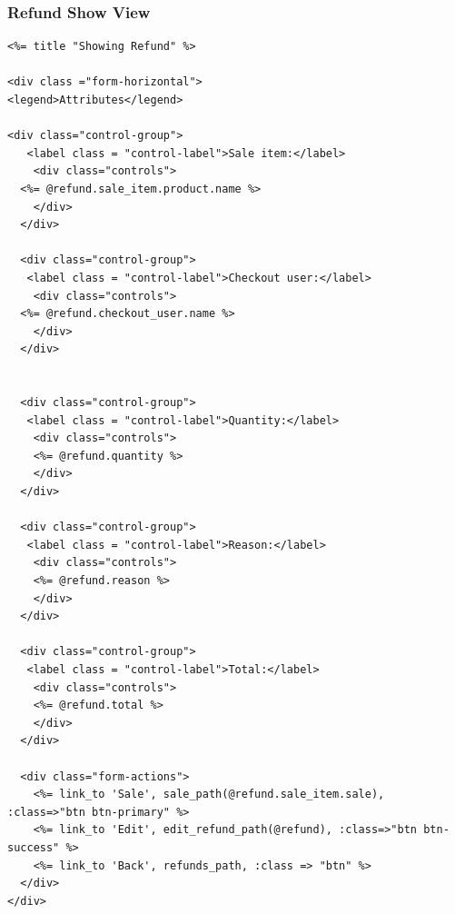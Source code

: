 \documentclass[a4paper]{article}
\begin{document}
\subsubsection{Refund Show View}
\begin{verbatim}
<%= title "Showing Refund" %>

<div class ="form-horizontal">
<legend>Attributes</legend>

<div class="control-group">
   <label class = "control-label">Sale item:</label>
    <div class="controls">
  <%= @refund.sale_item.product.name %>
    </div>
  </div>

  <div class="control-group">
   <label class = "control-label">Checkout user:</label>
    <div class="controls">
  <%= @refund.checkout_user.name %>
    </div>
  </div>


  <div class="control-group">
   <label class = "control-label">Quantity:</label>
    <div class="controls">
    <%= @refund.quantity %>
    </div>
  </div>

  <div class="control-group">
   <label class = "control-label">Reason:</label>
    <div class="controls">
    <%= @refund.reason %>
    </div>
  </div>

  <div class="control-group">
   <label class = "control-label">Total:</label>
    <div class="controls">
    <%= @refund.total %>
    </div>
  </div>

  <div class="form-actions">
    <%= link_to 'Sale', sale_path(@refund.sale_item.sale), :class=>"btn btn-primary" %>
    <%= link_to 'Edit', edit_refund_path(@refund), :class=>"btn btn-success" %>
    <%= link_to 'Back', refunds_path, :class => "btn" %>
  </div>
</div>
\end{verbatim}
\end{document}
